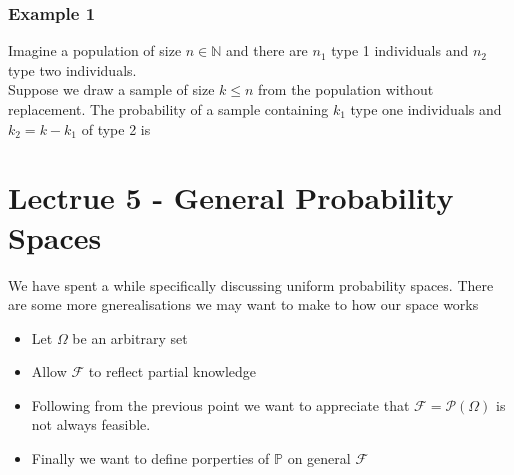\documentclass{article}
\begin{document}
\subsubsection{Example 1}
Imagine a population of size $n \in \mathbb{N}$ and there are $n_1$ type 1 individuals and $n_2$ type two individuals.\\
Suppose we draw a sample of size $k \le n$ from the population without replacement. The probability of a sample containing $k_1$ type one individuals and $k_2 = k - k_1$ of type 2 is 
\[\]
\section{Lectrue 5 - General Probability Spaces}
We have spent a while specifically discussing uniform probability spaces. There are some more gnerealisations we may want to make to how our space works
\begin{itemize}
    \item Let $\Omega$ be an arbitrary set
    \item Allow $\mathcal{F}$ to reflect partial knowledge
    \item Following from the previous point we want to appreciate that $\mathcal{F} = \mathcal{P}(\Omega)$ is not always feasible.
    \item Finally we want to define porperties of $\mathbb{P}$ on general $\mathcal{F}$
\end{itemize}
\end{document}
